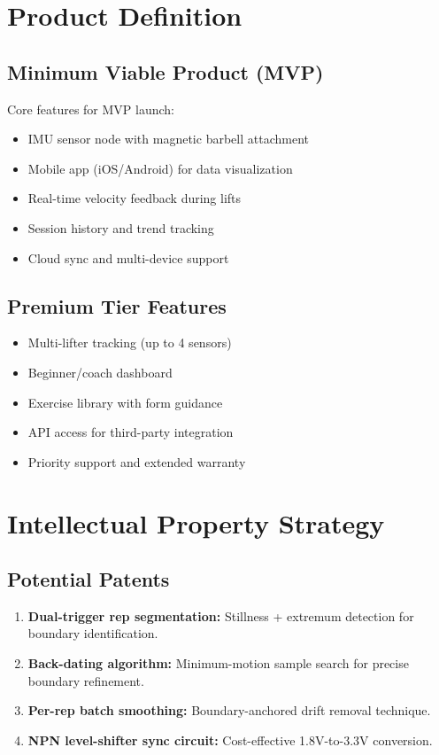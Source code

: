 \section{Product Definition}

\subsection{Minimum Viable Product (MVP)}

Core features for MVP launch:
\begin{itemize}
    \item IMU sensor node with magnetic barbell attachment
    \item Mobile app (iOS/Android) for data visualization
    \item Real-time velocity feedback during lifts
    \item Session history and trend tracking
    \item Cloud sync and multi-device support
\end{itemize}

\subsection{Premium Tier Features}

\begin{itemize}
    \item Multi-lifter tracking (up to 4 sensors)
    \item Beginner/coach dashboard
    \item Exercise library with form guidance
    \item API access for third-party integration
    \item Priority support and extended warranty
\end{itemize}

\section{Intellectual Property Strategy}

\subsection{Potential Patents}

\begin{enumerate}
    \item \textbf{Dual-trigger rep segmentation:} Stillness + extremum detection for boundary identification.
    \item \textbf{Back-dating algorithm:} Minimum-motion sample search for precise boundary refinement.
    \item \textbf{Per-rep batch smoothing:} Boundary-anchored drift removal technique.
    \item \textbf{NPN level-shifter sync circuit:} Cost-effective 1.8V-to-3.3V conversion.
\end{enumerate}

